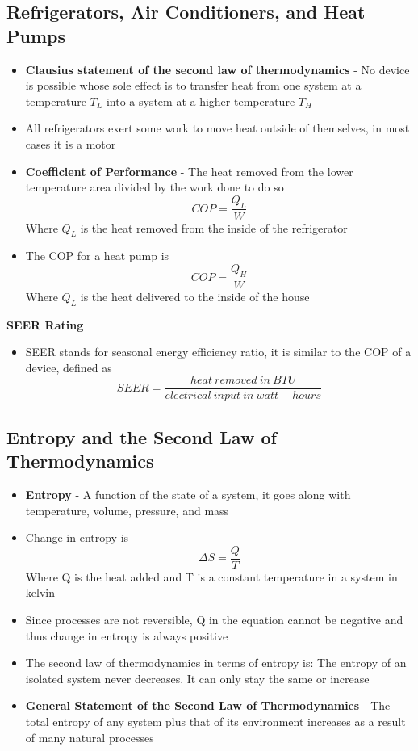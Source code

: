 \subsection{Refrigerators, Air Conditioners, and Heat Pumps}
\begin{itemize}
    \item \textbf{Clausius statement of the second law of thermodynamics} - No device is possible whose sole effect is to transfer heat from one system at a temperature \(T_L\) into a system at a higher temperature \(T_H\)
    \item All refrigerators exert some work to move heat outside of themselves, in most cases it is a motor
    \item \textbf{Coefficient of Performance} - The heat removed from the lower temperature area divided by the work done to do so \[COP=\frac{Q_L}{W}\] Where \(Q_L\) is the heat removed from the inside of the refrigerator
    \item The COP for a heat pump is \[COP=\frac{Q_H}{W}\] Where \(Q_L\) is the heat delivered to the inside of the house
\end{itemize}

\textbf{SEER Rating}
\begin{itemize}
    \item SEER stands for seasonal energy efficiency ratio, it is similar to the COP of a device, defined as \[SEER=\frac{heat\ removed\ in\ BTU}{electrical\ input\ in \ watt-hours}\]
\end{itemize}

\subsection{Entropy and the Second Law of Thermodynamics}
\begin{itemize}
    \item \textbf{Entropy} - A function of the state of a system, it goes along with temperature, volume, pressure, and mass
    \item Change in entropy is \[\Delta S=\frac{Q}{T}\] Where Q is the heat added and T is a constant temperature in a system in kelvin 
    \item Since processes are not reversible, Q in the equation cannot be negative and thus change in entropy is always positive
    \item The second law of thermodynamics in terms of entropy is: The entropy of an isolated system never decreases. It can only stay the same or increase
    \item \textbf{General Statement of the Second Law of Thermodynamics} - The total entropy of any system plus that of its environment increases as a result of many natural processes
\end{itemize}

